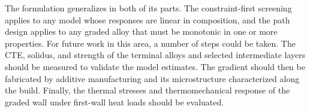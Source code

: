 The formulation generalizes in both of its parts. The constraint-first screening
applies to any model whose responses are linear in composition, and the path design
applies to any graded alloy that must be monotonic in one or more properties. For
future work in this area, a number of steps could be taken. The CTE, solidus, and
strength of the terminal alloys and selected intermediate layers should be measured
to validate the model estimates. The gradient should then be fabricated by additive
manufacturing and its microstructure characterized along the build. Finally, the
thermal stresses and thermomechanical response of the graded wall under first-wall
heat loads should be evaluated.
